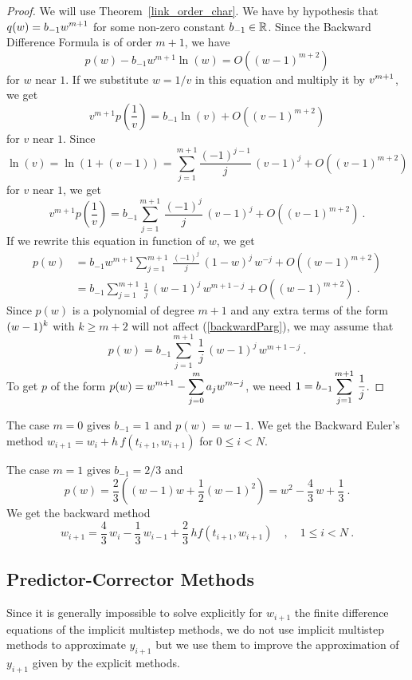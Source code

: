 \begin{proof}
We will use Theorem~\ref{link_order_char}.  We have by hypothesis that
$\displaystyle q(w) = b_{-1} w^{m+1}$ for some non-zero constant
$b_{-1} \in \mathbb{R}$.  
Since the Backward Difference Formula is of order $m+1$, we have
\begin{equation} \label{backwardParg}
p(w) - b_{-1} w^{m+1} \ln(w) = O((w-1)^{m+2})
\end{equation}
for $w$ near $1$.  If we substitute $w=1/v$ in this equation and
multiply it by $\displaystyle v^{m+1}$, we get
\[
v^{m+1}p\left(\frac{1}{v}\right) = b_{-1} \ln(v) + O((v-1)^{m+2})
\]
for $v$ near $1$.  Since
\[
\ln(v) = \ln(1+(v-1)) = \sum_{j=1}^{m+1} \frac{(-1)^{j-1}}{j}\,(v-1)^j +
O((v-1)^{m+2})
\]
for $v$ near $1$, we get
\[
v^{m+1} p\left(\frac{1}{v}\right) =
b_{-1} \sum_{j=1}^{m+1}\,\frac{(-1)^j}{j}\,(v-1)^j + O((v-1)^{m+2}) \ .
\]
If we rewrite this equation in function of $w$, we get
\begin{align*}
p(w) &= b_{-1} w^{m+1} \sum_{j=1}^{m+1}\,\frac{(-1)^j}{j}\,(1-w)^j\,w^{-j} +
O((w-1)^{m+2}) \\
&= b_{-1} \sum_{j=1}^{m+1}\,\frac{1}{j}\,(w-1)^j\,w^{m+1-j} +
O((w-1)^{m+2})  \ .
\end{align*}
Since $p(w)$ is a polynomial of degree $m+1$ and any extra terms
of the form $\displaystyle (w-1)^k$ with $k\geq m+2$ will not affect
(\ref{backwardParg}), we may assume that
\[
p(w) = b_{-1} \sum_{j=1}^{m+1}\,\frac{1}{j}\,(w-1)^j\,w^{m+1-j} \ .
\]
To get $p$ of the form
$\displaystyle p(w) = w^{m+1} - \sum_{j=0}^m a_j w^{m-j}$, we need
$\displaystyle 1 = b_{-1} \sum_{j=1}^{m+1}\,\frac{1}{j}$.
\end{proof}

\begin{egg}
The case $m=0$ gives $b_{-1} = 1$ and $p(w) = w -1$.  We get the 
Backward Euler's method $w_{i+1} = w_i + h\,f(t_{i+1},w_{i+1})$ for
$0 \leq i < N$.

The case $m=1$ gives $b_{-1} = 2/3$ and
\[
p(w) = \frac{2}{3} \left( (w-1)w + \frac{1}{2} (w-1)^2\right)
= w^2 - \frac{4}{3}\, w + \frac{1}{3} \ .
\]
We get the backward method
\[
w_{i+1} = \frac{4}{3}\, w_i - \frac{1}{3} \, w_{i-1}
+ \frac{2}{3}\,h f(t_{i+1},w_{i+1}) \quad, \quad 1 \leq i < N \ .
\]
\end{egg}

\subsection{Predictor-Corrector Methods}

Since it is generally impossible to solve explicitly for $w_{i+1}$ the
finite difference equations of the implicit multistep methods, we do not use
implicit multistep methods to approximate $y_{i+1}$ but we use them
to improve the approximation of $y_{i+1}$ given by the explicit
methods.

